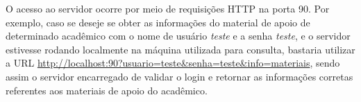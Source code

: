 O acesso ao servidor ocorre por meio de requisições HTTP na porta 90. Por exemplo, caso se deseje se obter as informações do material de apoio de determinado acadêmico com o nome de usuário \emph{teste} e a senha \emph{teste}, e o servidor estivesse rodando localmente na máquina utilizada para consulta, bastaria utilizar a URL \url{http://localhost:90?usuario=teste&senha=teste&info=materiais}, sendo assim o servidor encarregado de validar o login e retornar as informações corretas referentes aos materiais de apoio do acadêmico.